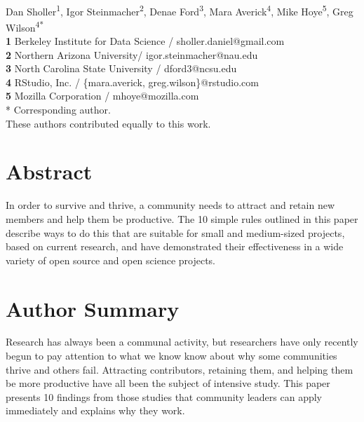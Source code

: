 \documentclass[10pt,letterpaper]{article}
\begin{document}
\vspace*{0.2in}

\begin{flushleft}
{\Large
\textbf{}
}
\newline
\\
{Dan Sholler}\textsuperscript{1{\ddag}},
{Igor Steinmacher}\textsuperscript{2{\ddag}},
{Denae Ford}\textsuperscript{3{\ddag}},
{Mara Averick}\textsuperscript{4{\ddag}},
{Mike Hoye}\textsuperscript{5{\ddag}},
{Greg Wilson}\textsuperscript{4{\ddag}*}
\\
\bigskip
\textbf{1} Berkeley Institute for Data Science / sholler.daniel@gmail.com \\
\textbf{2} Northern Arizona University/ igor.steinmacher@nau.edu \\\bigskip
\textbf{3} North Carolina State University / dford3@ncsu.edu \\
\textbf{4} RStudio, Inc. / \{mara.averick, greg.wilson\}@rstudio.com \\
\textbf{5} Mozilla Corporation / mhoye@mozilla.com \\
* Corresponding author. \\
\bigskip
{\ddag} These authors contributed equally to this work.
\end{flushleft}

\section*{Abstract}

In order to survive and thrive,
a community needs to attract and retain new members
and help them be productive.
The 10 simple rules outlined in this paper
describe ways to do this that are suitable for small and medium-sized projects,
based on current research,
and have demonstrated their effectiveness
in a wide variety of open source and open science projects.

\section*{Author Summary}

Research has always been a communal activity,
but researchers have only recently begun to pay attention to
what we know know about why some communities thrive and others fail.
Attracting contributors,
retaining them,
and helping them be more productive
have all been the subject of intensive study.
This paper presents 10 findings from those studies that community leaders can apply immediately
and explains why they work.
\end{document}
